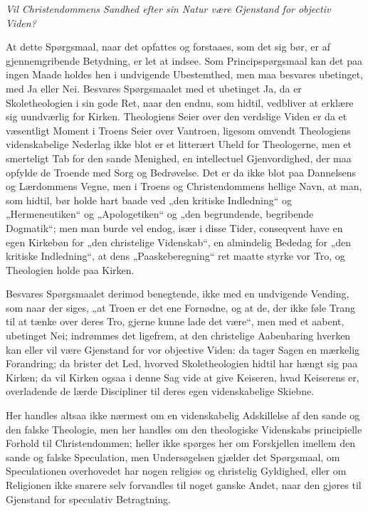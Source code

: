 \begin{center}
\emph{Vil Christendommens Sandhed efter sin Natur være Gjenstand
for objectiv Viden?}
\end{center}

At dette Spørgsmaal, naar det opfattes og forstaaes, som det sig
bør, er af gjennemgribende Betydning, er let at indsee. Som
Principspørgsmaal kan det paa ingen Maade holdes hen i undvigende
Ubestemthed,
 men maa besvares ubetinget, med Ja eller Nei. Besvares
Spørgsmaalet med et ubetinget Ja, da er Skoletheologien i sin gode
Ret, naar den endnu, som hidtil, vedbliver at erklære sig
uundværlig for Kirken. Theologiens Seier over den verdslige Viden
er da et væsentligt Moment i Troens Seier over Vantroen, ligesom
omvendt Theologiens videnskabelige Nederlag ikke blot er et
litterært Uheld for Theologerne, men et smerteligt Tab for den
sande Menighed, en intellectuel Gjenvordighed, der maa opfylde de
Troende med Sorg og Bedrøvelse. Det er da ikke blot paa Dannelsens
og Lærdommens Vegne, men i Troens og Christendommens hellige Navn,
at man, som hidtil, bør holde hart baade ved „den kritiske
Indledning“ og „Hermeneutiken“ og „Apologetiken“ og „den
begrundende, begribende Dogmatik“; men man burde vel endog, især i
disse Tider, conseqvent have en egen Kirkebøn for „den christelige
Videnskab“, en almindelig Bededag for „den kritiske Indledning“,
at dens „Paaskeberegning“ ret maatte styrke vor Tro, og Theologien
holde paa Kirken.

Besvares Spørgsmaalet derimod benegtende, ikke med en undvigende
Vending, som naar der siges, „at Troen er det ene Fornødne, og at
de, der ikke føle Trang til at tænke over deres Tro, gjerne kunne
lade det være“, men med et aabent, ubetinget Nei; indrømmes det
ligefrem, at den christelige Aabenbaring hverken kan eller vil
være Gjenstand for vor objective Viden: da tager Sagen en mærkelig
Forandring; da brister det Led, hvorved Skoletheologien hidtil har
hængt
 sig paa Kirken; da vil Kirken ogsaa i denne Sag vide at give
Keiseren, hvad Keiserens er, overladende de lærde Discipliner til
deres egen videnskabelige Skiebne.

Her handles altsaa ikke nærmest om en videnskabelig Adskillelse af
den sande og den falske Theologie, men her handles om den
theologiske Videnskabs principielle Forhold til Christendommen;
heller ikke spørges her om Forskjellen imellem den sande og falske
Speculation, men Undersøgelsen gjælder det Spørgsmaal, om
Speculationen overhovedet har nogen religiøs og christelig
Gyldighed, eller om Religionen ikke snarere selv forvandles til
noget ganske Andet, naar den gjøres til Gjenstand for speculativ
Betragtning.

